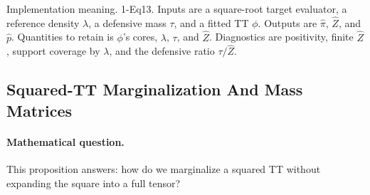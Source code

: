 \documentclass[11pt]{article}
\numberwithin{equation}{section}
\begin{document}
\begin{center}
\end{center}

Implementation meaning. 1-Eq13.  Inputs are a square-root target
evaluator, a reference density \(\lambda\), a defensive mass \(\tau\), and a
fitted TT \(\phi\).  Outputs are \(\widehat\pi\), \(\widehat Z\), and
\(\widehat p\).  Quantities to retain is \(\phi\)'s cores, \(\lambda\), \(\tau\),
and \(\widehat Z\).  Diagnostics are positivity, finite \(\widehat Z\), support
coverage by \(\lambda\), and the defensive ratio \(\tau/\widehat Z\).

\subsection{Squared-TT Marginalization And Mass Matrices}

\paragraph{Mathematical question.}
This proposition answers: how do we marginalize a squared TT without expanding
the square into a full tensor?
\end{document}
